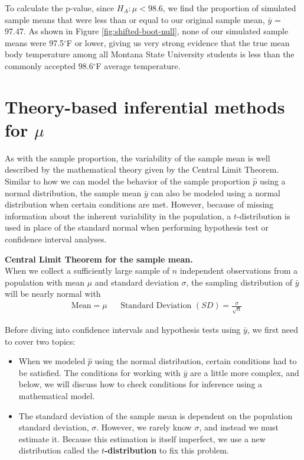 \documentclass[
  10pt,
  openany]{book}
\providecommand{\tightlist}{%
  \setlength{\itemsep}{0pt}\setlength{\parskip}{0pt}}
\theoremstyle{definition}
\theoremstyle{definition}
\theoremstyle{definition}
\theoremstyle{definition}
\theoremstyle{remark}
\begin{document}
To calculate the p-value, since \(H_A: \mu < 98.6\), we find the proportion of simulated sample means that were less than or equal to our original sample mean, \(\bar{y}\) = 97.47. As shown in Figure \ref{fig:shifted-boot-null}, none of our simulated sample means were 97.5\(^\circ\)F or lower, giving us very strong evidence that the true mean body temperature among all Montana State University students is less than the commonly accepted 98.6\(^\circ\)F average temperature.

\section{\texorpdfstring{Theory-based inferential methods for \(\mu\)}{Theory-based inferential methods for \textbackslash mu}}\label{one-mean-math}

As with the sample proportion, the variability of the sample mean is well described by the mathematical theory given by the Central Limit Theorem. Similar to how we can model the behavior of the sample proportion \(\hat{p}\) using a normal distribution, the sample mean \(\bar{y}\) can also be modeled using
a normal distribution when certain conditions are met.
However, because of missing information about the inherent variability in the population, a \(t\)-distribution is used in place of the standard normal when performing hypothesis test or confidence interval analyses.

\textbf{Central Limit Theorem for the sample mean.}\\
When we collect a sufficiently large sample of
\(n\) independent observations from a population with
mean \(\mu\) and standard deviation \(\sigma\),
the sampling distribution of \(\bar{y}\) will be nearly
normal with
\begin{align*}
  &\text{Mean}=\mu
  &&\text{Standard Deviation }(SD) = \frac{\sigma}{\sqrt{n}}
  \end{align*}

Before diving into confidence intervals and hypothesis
tests using \(\bar{y}\), we first need to cover two topics:

\begin{itemize}
\tightlist
\item
  When we modeled \(\hat{p}\) using the normal distribution,
  certain conditions had to be satisfied.
  The conditions for working with \(\bar{y}\)
  are a little more complex, and below, we will discuss
  how to check conditions for inference using a mathematical model.
\item
  The standard deviation of the sample mean is dependent on the population
  standard deviation, \(\sigma\).
  However, we rarely know \(\sigma\), and instead
  we must estimate it.
  Because this estimation is itself imperfect,
  we use a new distribution called the
  \textbf{\(t\)-distribution}
  to fix this problem.
\end{itemize}
\end{document}
